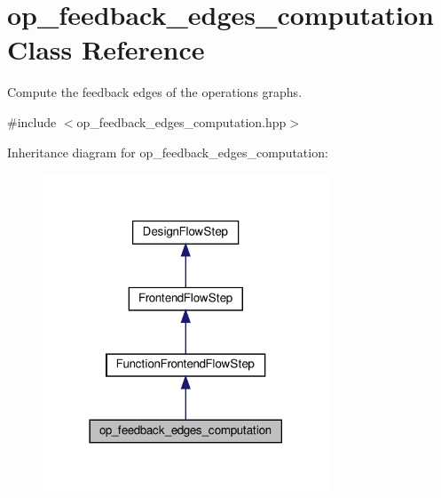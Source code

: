 \hypertarget{classop__feedback__edges__computation}{}\section{op\+\_\+feedback\+\_\+edges\+\_\+computation Class Reference}
\label{classop__feedback__edges__computation}


Compute the feedback edges of the operations graphs.  




{\ttfamily \#include $<$op\+\_\+feedback\+\_\+edges\+\_\+computation.\+hpp$>$}



Inheritance diagram for op\+\_\+feedback\+\_\+edges\+\_\+computation\+:
\nopagebreak
\begin{figure}[H]
\begin{center}
\leavevmode
\includegraphics[width=242pt]{de/d4a/classop__feedback__edges__computation__inherit__graph}
\end{center}
\end{figure}



